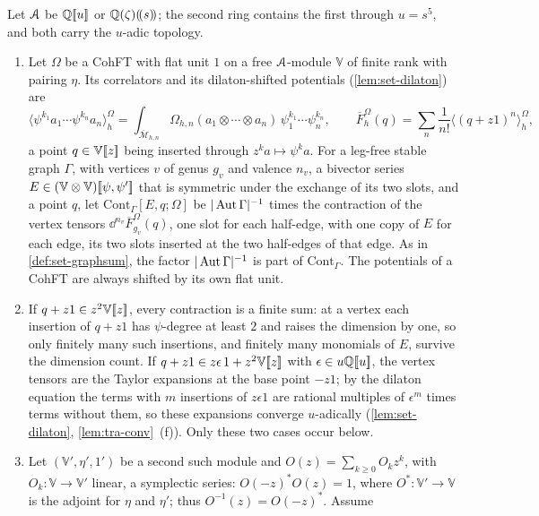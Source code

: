 \begin{defn}
\label{def:flh-outer}
Let $\mathcal{A}$ be $\mathbb{Q}[\![ u ]\!]$ or $\mathbb{Q}(\zeta)(\!(s)\!)$; the second ring contains the first through $u=s^5$, and both carry the $u$-adic topology.
\begin{enumerate}
\item Let $\Omega$ be a CohFT with flat unit $1$ \cite[Def.~0.3]{PPZ15} on a free $\mathcal{A}$-module $\mathbb V$ of finite rank with pairing $\eta$. Its correlators and its dilaton-shifted potentials (\cref{lem:set-dilaton}) are
\[
\langle\psi^{k_1}a_1\cdots\psi^{k_n}a_n\rangle^{\Omega}_h=\int_{\overline{\mathcal M}_{h,n}}\Omega_{h,n}(a_1\otimes\cdots\otimes a_n)\,\psi_1^{k_1}\cdots\psi_n^{k_n},\qquad\overline F^{\Omega}_h(q)=\sum_{n}\frac{1}{n!}\langle(q+z1)^n\rangle^{\Omega}_h ,
\]
a point $q\in\mathbb V[\![ z ]\!]$ being inserted through $z^ka\mapsto\psi^ka$. For a leg-free stable graph $\Gamma$, with vertices $v$ of genus $g_v$ and valence $n_v$, a bivector series $E\in(\mathbb V\otimes\mathbb V)[\![ \psi,\psi' ]\!]$ that is symmetric under the exchange of its two slots, and a point $q$, let $\mathrm{Cont}_\Gamma[E,q;\Omega]$ be $|\operatorname{Aut}\Gamma|^{-1}$ times the contraction of the vertex tensors $\dd^{n_v}\overline F^{\Omega}_{g_v}(q)$, one slot for each half-edge, with one copy of $E$ for each edge, its two slots inserted at the two half-edges of that edge. As in \cref{def:set-graphsum}, the factor $|\operatorname{Aut}\Gamma|^{-1}$ is part of $\mathrm{Cont}_\Gamma$. The potentials of a CohFT are always shifted by its own flat unit.
\item If $q+z1\in z^2\mathbb V[\![ z ]\!]$, every contraction is a finite sum: at a vertex each insertion of $q+z1$ has $\psi$-degree at least $2$ and raises the dimension by one, so only finitely many such insertions, and finitely many monomials of $E$, survive the dimension count. If $q+z1\in z\epsilon\,1+z^2\mathbb V[\![ z ]\!]$ with $\epsilon\in u\mathbb{Q}[\![ u ]\!]$, the vertex tensors are the Taylor expansions at the base point $-z1$; by the dilaton equation the terms with $m$ insertions of $z\epsilon 1$ are rational multiples of $\epsilon^m$ times terms without them, so these expansions converge $u$-adically (\cref{lem:set-dilaton}, \cref{lem:tra-conv}~(f)). Only these two cases occur below.
\item Let $(\mathbb V',\eta',1')$ be a second such module and $O(z)=\sum_{k\geq0}O_kz^k$, with $O_k\colon\mathbb V\to\mathbb V'$ linear, a symplectic series: $O(-z)^*O(z)=1$, where $O^*\colon\mathbb V'\to\mathbb V$ is the adjoint for $\eta$ and $\eta'$; thus $O^{-1}(z)=O(-z)^*$. Assume

\end{enumerate}
\end{defn}
